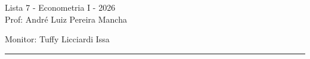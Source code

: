 \documentclass[12pt,letterpaper, onecolumn]{exam}
\begin{document}
	
	
	\begingroup  
	\centering
	\LARGE Lista 7 - Econometria I - 2026\\[0.5em]
	\large Prof: André Luiz Pereira Mancha \par
	\large Monitor: Tuffy Licciardi Issa  \par
	\endgroup
	\rule{\textwidth}{0.4pt}
	\pointsdroppedatright   %
	\printanswers
	\renewcommand{\solutiontitle}{\noindent\textbf{Ans:}\enspace}   %
	\newcommand{\qstar}{\hspace{-0.6em}\textsuperscript{*}\hspace{0.2em}}
	
\end{document}
